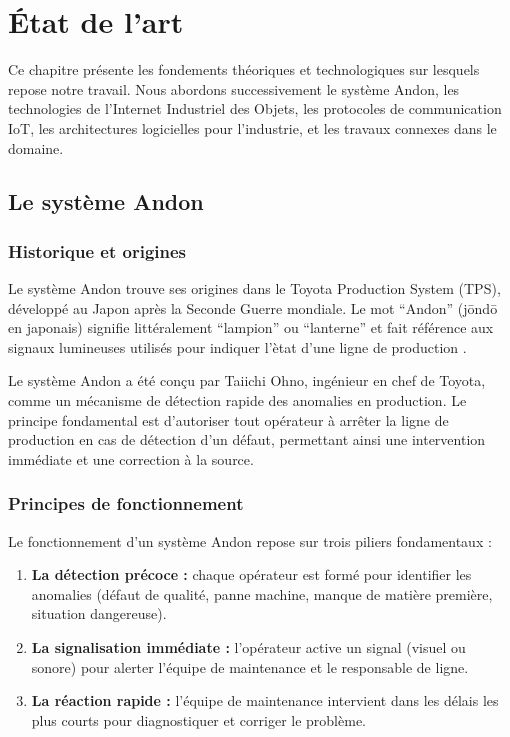 \chapter{\'Etat de l'art}

Ce chapitre pr\'esente les fondements th\'eoriques et technologiques sur lesquels repose notre travail. Nous abordons successivement le syst\`eme Andon, les technologies de l'Internet Industriel des Objets, les protocoles de communication IoT, les architectures logicielles pour l'industrie, et les travaux connexes dans le domaine.

\section{Le syst\`eme Andon}

\subsection{Historique et origines}

Le syst\`eme Andon trouve ses origines dans le Toyota Production System (TPS), d\'evelopp\'e au Japon apr\`es la Seconde Guerre mondiale. Le mot ``Andon'' (j\={o}nd\={o} en japonais) signifie litt\'eralement ``lampion'' ou ``lanterne'' et fait r\'ef\'erence aux signaux lumineuses utilis\'es pour indiquer l'\`etat d'une ligne de production \cite{liker2004toyota}.

Le syst\`eme Andon a \'et\'e con\c{c}u par Taiichi Ohno, ing\'enieur en chef de Toyota, comme un m\'ecanisme de d\'etection rapide des anomalies en production. Le principe fondamental est d'autoriser tout op\'erateur \`a arr\^eter la ligne de production en cas de d\'etection d'un d\'efaut, permettant ainsi une intervention imm\'ediate et une correction \`a la source.

\subsection{Principes de fonctionnement}

Le fonctionnement d'un syst\`eme Andon repose sur trois piliers fondamentaux :

\begin{enumerate}
    \item \textbf{La d\'etection pr\'ecoce :} chaque op\'erateur est form\'e pour identifier les anomalies (d\'efaut de qualit\'e, panne machine, manque de mati\`ere premi\`ere, situation dangereuse).
    
    \item \textbf{La signalisation imm\'ediate :} l'op\'erateur active un signal (visuel ou sonore) pour alerter l'\'equipe de maintenance et le responsable de ligne.
    
    \item \textbf{La r\'eaction rapide :} l'\'equipe de maintenance intervient dans les d\'elais les plus courts pour diagnostiquer et corriger le probl\`eme.
\end{enumerate}


